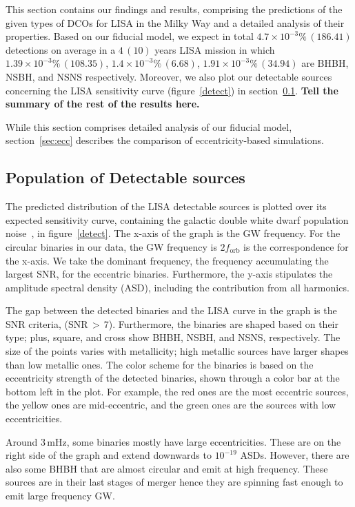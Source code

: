 \documentclass[journal, twocolumn]{IEEEtran}
\begin{document}
    This section contains our findings and results, comprising the predictions of the given types of DCOs for LISA in the Milky Way and a detailed analysis of their properties.
    Based on our fiducial model, we expect in total $4.7\times 10^{-3}\%\,(186.41)$ detections on average in a $4\,(10)$ years LISA mission in which $1.39\times 10^{-3}\%\,(108.35)$, $1.4\times 10^{-3}\%\,(6.68)$, $1.91\times 10^{-3}\%\,(34.94)$ are BHBH, NSBH, and NSNS respectively.
    Moreover, we also plot our detectable sources concerning the LISA sensitivity curve (figure~\ref{detect}) in section~\ref{subsec:r11}. \textbf{Tell the summary of the rest of the results here.}

    While this section comprises detailed analysis of our fiducial model, section~\ref{sec:ecc} describes the comparison of
    eccentricity-based simulations.

    \subsection{Population of Detectable sources} \label{subsec:r11}
    The predicted distribution of the LISA detectable sources is plotted over its expected sensitivity curve, containing the galactic double white dwarf population noise~\cite{Robson2019}, in figure~\ref{detect}.
    The x-axis of the graph is the GW frequency.
    For the circular binaries in our data, the GW frequency is $2f_\text{orb}$ is the correspondence for the x-axis.
    We take the dominant frequency, the frequency accumulating the largest SNR, for the eccentric binaries.
    Furthermore, the y-axis stipulates the amplitude spectral density (ASD), including the contribution from all harmonics.

    The gap between the detected binaries and the LISA curve in the graph is the SNR criteria, ($\text{SNR}\,>\,7$). Furthermore, the binaries are shaped based on their type; plus, square, and cross show BHBH, NSBH, and NSNS, respectively.
    The size of the points varies with metallicity; high metallic sources have larger shapes than low metallic ones.
    The color scheme for the binaries is based on the eccentricity strength of the detected binaries, shown through a color bar at the bottom left in the plot.
    For example, the red ones are the most eccentric sources, the yellow ones are mid-eccentric, and the green ones are the sources with low eccentricities.

    Around $3\,\text{mHz}$, some binaries mostly have large eccentricities.
    These are on the right side of the graph and extend downwards to $10^{-19}$ ASDs. However, there are also some BHBH that are almost circular and emit at high frequency.
    These sources are in their last stages of merger hence they are spinning fast enough to emit large frequency GW\@.
\end{document}
